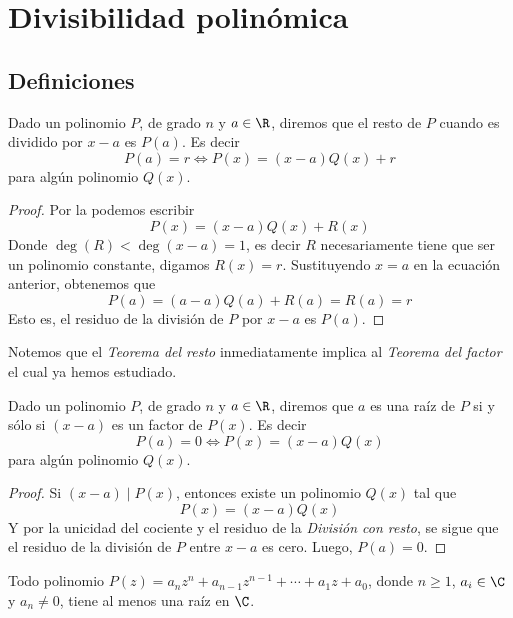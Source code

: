 \newpage
\section{Divisibilidad polinómica}


\subsection{Definiciones}

\begin{section-theorem.tcb}
    Dado un polinomio $P$, de grado $n$ y $a \in \R$, diremos que el resto de $P$ cuando es dividido por $x - a$ es $P(a)$.
    Es decir
    \[P(a)   = r \Leftrightarrow P(x) = (x-a)Q(x) + r\]
    para algún polinomio $Q(x).$
\end{section-theorem.tcb}
\begin{proof}
    Por la  podemos escribir
    \[P(x) = (x-a)Q(x) + R(x)\]
    Donde $\deg (R) < \deg(x - a) = 1$, es decir $R$ necesariamente tiene que ser un polinomio constante, digamos $R(x) = r$.
    Sustituyendo $x = a$ en la ecuación anterior, obtenemos que
    \[P(a) = (a - a)Q(a) + R(a) = R(a) = r\]
    Esto es, el residuo de la división de $P$ por $x - a$ es $P(a)$.
\end{proof}

Notemos que el \textit{Teorema del resto} inmediatamente implica al \textit{Teorema del factor} el cual ya hemos estudiado.

\begin{section-theorem.tcb}
    Dado un polinomio $P$, de grado $n$ y $a \in \R$, diremos que $a$ es una raíz de $P$ si y sólo si $(x-a)$ es un factor de $P(x)$.
    Es decir
    \[P(a) = 0 \Leftrightarrow P(x) = (x-a)Q(x)\]
    para algún polinomio $Q(x).$
\end{section-theorem.tcb}

\begin{proof}
    Si $(x - a) \mid P(x)$, entonces existe un polinomio $Q(x)$ tal que
    \[P(x) = (x-a)Q(x)\]
    Y por la unicidad del cociente y el residuo de la \textit{División con resto}, se sigue que el residuo de la división de $P$ entre $x - a$ es cero.
    Luego, $P(a) = 0$.
\end{proof}

\begin{section-theorem.tcb}
    Todo polinomio $P(z) = a_n z^n + a_{n - 1} z^{n - 1} + \cdots + a_1 z + a_0$, donde $n \geq 1$, $a_i \in \C$ y $a_n \neq 0$, tiene al menos una raíz en $\C$.
\end{section-theorem.tcb}

